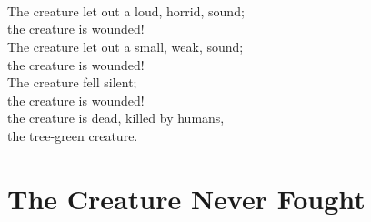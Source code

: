 \documentclass{ctexart}
\begin{document}
\begin{minipage}[t]{5.75cm}
{\textCJKserif{}\large
  \\
  \\
  \\
  \\
  \hspace{0.2em}\\
  \\
  \\
  \\
  \scriptsize
  The creature let out a loud, horrid, sound;\\
  the creature is wounded!\\
  The creature let out a small, weak, sound;\\
  the creature is wounded!\\
  The creature fell silent;\\
  the creature is wounded!\\
  the creature is dead, killed by humans,\\
  the tree-green creature.\\
}
\end{minipage}

\section[獣り打不]{
  \Huge\englishundertokisin
    {}
    {\large\normalfont{}The Creature Never Fought}
}
\end{document}
